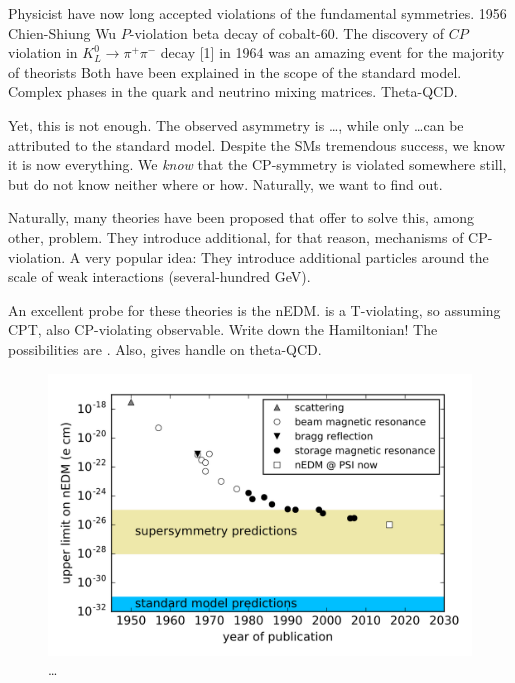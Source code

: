 Physicist have now long accepted violations of the fundamental symmetries.
1956 Chien-Shiung Wu $P$-violation beta decay of cobalt-60. 
The discovery of $CP$ violation in $K^0_L \rightarrow \pi^+ \pi^-$ decay [1] in 1964 was an amazing event for the majority of theorists
Both have been explained in the scope of the standard model. Complex phases in the quark and neutrino mixing matrices. Theta-QCD.

Yet, this is not enough. \cite{Pospelov2005} The observed asymmetry is \ldots, while only \ldots can be attributed to the standard model. Despite the SMs tremendous success, we know it is now everything. We \emph{know} that the CP-symmetry is violated somewhere still, but do not know neither where or how. Naturally, we want to find out.

Naturally, many theories have been proposed that offer to solve this, among other, problem. They introduce additional, for that reason, mechanisms of CP-violation. A very popular idea: They introduce additional particles around the scale of weak interactions (several-hundred GeV).

An excellent probe for these theories is the nEDM. is a T-violating, so assuming CPT, also CP-violating observable. Write down the Hamiltonian!
The possibilities are \cite{Ellis1989}.
Also, gives handle on theta-QCD.

\begin{figure}
  \centering
  \includegraphics[width=\linewidth]{gfx/introduction/limits.png}
  \caption{\ldots {}  }
  \label{fig:nEDM_limits_history}
\end{figure}

